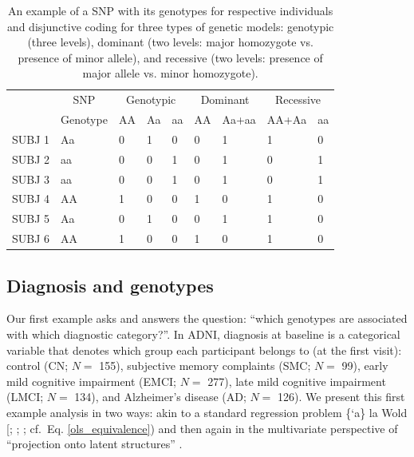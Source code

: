 \documentclass[12pt]{article}
\begin{document}
\begin{table}[!h]

\caption{\label{tab:unnamed-chunk-2}\label{table:snps_models_disj} An example of a SNP with its genotypes for respective individuals and disjunctive coding for three types of genetic models: genotypic (three levels), dominant (two levels: major homozygote vs. presence of minor allele), and recessive (two levels: presence of major allele vs. minor homozygote).}
\centering
\begin{tabular}[t]{lllllllll}
\toprule
\multicolumn{1}{c}{ } & \multicolumn{1}{c}{SNP} & \multicolumn{3}{c}{Genotypic} & \multicolumn{2}{c}{Dominant} & \multicolumn{2}{c}{Recessive} \\
\cmidrule(l{2pt}r{2pt}){2-2} \cmidrule(l{2pt}r{2pt}){3-5} \cmidrule(l{2pt}r{2pt}){6-7} \cmidrule(l{2pt}r{2pt}){8-9}
  & Genotype & AA & Aa & aa & AA & Aa+aa & AA+Aa & aa\\
\midrule
SUBJ 1 & Aa & 0 & 1 & 0 & 0 & 1 & 1 & 0\\
SUBJ 2 & aa & 0 & 0 & 1 & 0 & 1 & 0 & 1\\
SUBJ 3 & aa & 0 & 0 & 1 & 0 & 1 & 0 & 1\\
SUBJ 4 & AA & 1 & 0 & 0 & 1 & 0 & 1 & 0\\
SUBJ 5 & Aa & 0 & 1 & 0 & 0 & 1 & 1 & 0\\
\addlinespace
SUBJ 6 & AA & 1 & 0 & 0 & 1 & 0 & 1 & 0\\
\bottomrule
\end{tabular}
\end{table}

\hypertarget{diagnosis-and-genotypes}{%
\subsection{Diagnosis and genotypes}\label{diagnosis-and-genotypes}}

\label{section:plscarda}

Our first example asks and answers the question: ``which genotypes are
associated with which diagnostic category?''. In ADNI, diagnosis at
baseline is a categorical variable that denotes which group each
participant belongs to (at the first visit): control (CN; \(N=\) 155),
subjective memory complaints (SMC; \(N=\) 99), early mild cognitive
impairment (EMCI; \(N=\) 277), late mild cognitive impairment (LMCI;
\(N=\) 134), and Alzheimer's disease (AD; \(N=\) 126). We present this
first example analysis in two ways: akin to a standard regression
problem \{`a\} la Wold {[}\citet{wold_soft_1975};
\citet{wold_collinearity_1984}; \citet{wold_principal_1987}; cf.~Eq.
\ref{ols_equivalence}) and then again in the multivariate perspective of
``projection onto latent structures'' \citep{abdi_partial_2010-1}.
\end{document}
